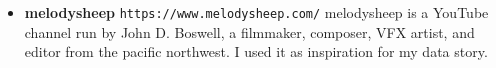 \documentclass{article}
\begin{document}
\begin{itemize}
    \newpage
    \item \textbf{melodysheep} \newline
    \texttt{https://www.melodysheep.com/} \newline
    melodysheep is a YouTube channel run by John D. Boswell, a filmmaker, composer, VFX artist, and editor from the pacific northwest.
    I used it as inspiration for my data story.
\end{itemize}
\end{document}
